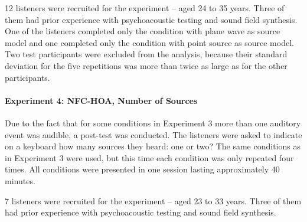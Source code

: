 12 listeners were recruited for the experiment -- aged 24 to 35 years.
Three of them had prior experience with psychoacoustic testing and sound field
synthesis.
One of the listeners completed only the condition with plane wave as source
model and one completed only the condition with point source as source model.
Two test participants were excluded from the analysis, because their standard deviation
for the five repetitions was more than twice as large as for the other
participants.


\paragraph{Experiment 4: \ac{NFC-HOA}, Number of Sources}
\label{sec:experiment4_nfchoa_circular_loudspeaker_array_number_of_sources}
%
Due to the fact that for some conditions in Experiment 3 more than one auditory
event was audible, a post-test was conducted. The listeners were asked to
indicate on a keyboard how many sources they heard: one or two?
The same conditions as in Experiment 3 were used, but this time each condition
was only repeated four times.
All conditions were presented in one session lasting approximately 40 minutes.

7 listeners were recruited for the experiment -- aged 23 to 33 years.
Three of them had prior experience with psychoacoustic testing and sound field
synthesis.




